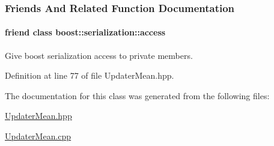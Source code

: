 \subsubsection{Friends And Related Function Documentation}
\hypertarget{classDmpBbo_1_1UpdaterMean_ac98d07dd8f7b70e16ccb9a01abf56b9c}{
\paragraph[{boost\+::serialization\+::access}]{\setlength{\rightskip}{0pt plus 5cm}friend class boost\+::serialization\+::access\hspace{0.3cm}{\ttfamily [friend]}}}\label{classDmpBbo_1_1UpdaterMean_ac98d07dd8f7b70e16ccb9a01abf56b9c}


Give boost serialization access to private members. 



Definition at line 77 of file Updater\+Mean.\+hpp.



The documentation for this class was generated from the following files\+:\begin{DoxyCompactItemize}
\item 
\hyperlink{UpdaterMean_8hpp}{Updater\+Mean.\+hpp}\item 
\hyperlink{UpdaterMean_8cpp}{Updater\+Mean.\+cpp}\end{DoxyCompactItemize}
